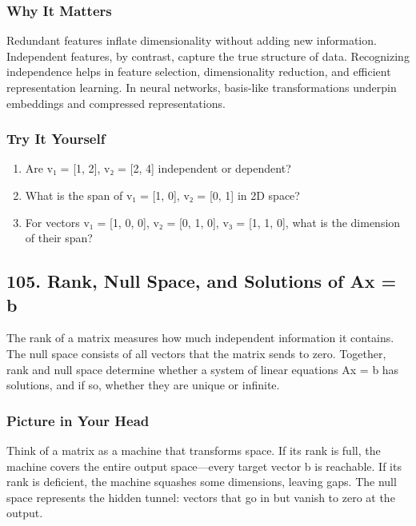 \documentclass[
  letterpaper,
  DIV=11,
  numbers=noendperiod]{scrreprt}
\providecommand{\tightlist}{%
  \setlength{\itemsep}{0pt}\setlength{\parskip}{0pt}}
\begin{document}
\subsubsection{Why It Matters}\label{why-it-matters-1}

Redundant features inflate dimensionality without adding new
information. Independent features, by contrast, capture the true
structure of data. Recognizing independence helps in feature selection,
dimensionality reduction, and efficient representation learning. In
neural networks, basis-like transformations underpin embeddings and
compressed representations.

\subsubsection{Try It Yourself}\label{try-it-yourself-103}

\begin{enumerate}
\def\labelenumi{\arabic{enumi}.}
\tightlist
\item
  Are v₁ = {[}1, 2{]}, v₂ = {[}2, 4{]} independent or dependent?
\item
  What is the span of v₁ = {[}1, 0{]}, v₂ = {[}0, 1{]} in 2D space?
\item
  For vectors v₁ = {[}1, 0, 0{]}, v₂ = {[}0, 1, 0{]}, v₃ = {[}1, 1,
  0{]}, what is the dimension of their span?
\end{enumerate}

\subsection{105. Rank, Null Space, and Solutions of Ax =
b}\label{rank-null-space-and-solutions-of-ax-b}

The rank of a matrix measures how much independent information it
contains. The null space consists of all vectors that the matrix sends
to zero. Together, rank and null space determine whether a system of
linear equations Ax = b has solutions, and if so, whether they are
unique or infinite.

\subsubsection{Picture in Your Head}\label{picture-in-your-head-104}

Think of a matrix as a machine that transforms space. If its rank is
full, the machine covers the entire output space---every target vector b
is reachable. If its rank is deficient, the machine squashes some
dimensions, leaving gaps. The null space represents the hidden tunnel:
vectors that go in but vanish to zero at the output.
\end{document}
